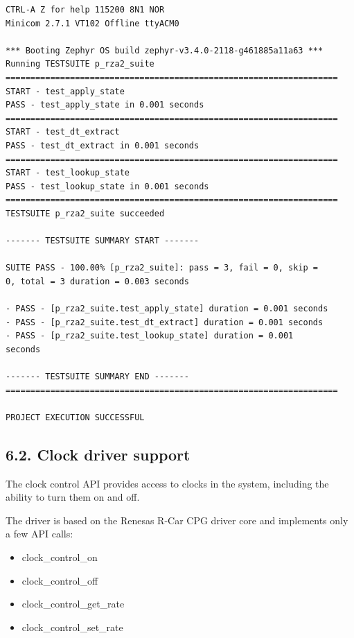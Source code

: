 \documentclass[11pt,a4paper,oneside]{article}
\begin{document}
\begin{lstlisting}
CTRL-A Z for help 115200 8N1 NOR
Minicom 2.7.1 VT102 Offline ttyACM0

*** Booting Zephyr OS build zephyr-v3.4.0-2118-g461885a11a63 ***
Running TESTSUITE p_rza2_suite
===================================================================
START - test_apply_state
PASS - test_apply_state in 0.001 seconds
===================================================================
START - test_dt_extract
PASS - test_dt_extract in 0.001 seconds
===================================================================
START - test_lookup_state
PASS - test_lookup_state in 0.001 seconds
===================================================================
TESTSUITE p_rza2_suite succeeded

------- TESTSUITE SUMMARY START -------

SUITE PASS - 100.00% [p_rza2_suite]: pass = 3, fail = 0, skip =
0, total = 3 duration = 0.003 seconds

- PASS - [p_rza2_suite.test_apply_state] duration = 0.001 seconds
- PASS - [p_rza2_suite.test_dt_extract] duration = 0.001 seconds
- PASS - [p_rza2_suite.test_lookup_state] duration = 0.001
seconds

------- TESTSUITE SUMMARY END -------
===================================================================

PROJECT EXECUTION SUCCESSFUL
\end{lstlisting}

\subsection*{6.2. Clock driver support}\label{clock-driver-support}

The clock control API provides access to clocks in the system, including
the ability to turn them on and off.

The driver is based on the Renesas R-Car CPG driver core and implements
only a few API calls:
\begin{itemize}
  \item
    clock\_control\_on
  \item
    clock\_control\_off
  \item
    clock\_control\_get\_rate
  \item
    clock\_control\_set\_rate
\end{itemize}
\end{document}
